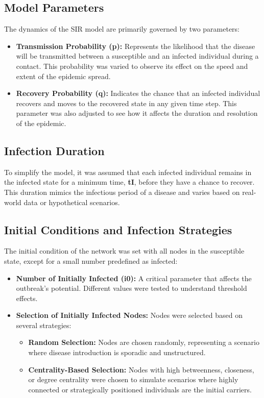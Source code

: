 \documentclass[
	report, %
	11pt, %
]{CSUniSchoolLabReport}
\newcounter{ct}
\begin{document}
\subsection{Model Parameters}
The dynamics of the SIR model are primarily governed by two parameters:
\begin{itemize}
\item \textbf{Transmission Probability (p):} Represents the likelihood that the disease will be transmitted between a susceptible and an infected individual during a contact. This probability was varied to observe its effect on the speed and extent of the epidemic spread.
\item \textbf{Recovery Probability (q):} Indicates the chance that an infected individual recovers and moves to the recovered state in any given time step. This parameter was also adjusted to see how it affects the duration and resolution of the epidemic.
\end{itemize}

\subsection{Infection Duration}
To simplify the model, it was assumed that each infected individual remains in the infected state for a minimum time, \textbf{tI}, before they have a chance to recover. This duration mimics the infectious period of a disease and varies based on real-world data or hypothetical scenarios.

\subsection{Initial Conditions and Infection Strategies}
The initial condition of the network was set with all nodes in the susceptible state, except for a small number predefined as infected:
\begin{itemize}
\item \textbf{Number of Initially Infected (i0):} A critical parameter that affects the outbreak's potential. Different values were tested to understand threshold effects.
\item \textbf{Selection of Initially Infected Nodes:} Nodes were selected based on several strategies:
\begin{itemize}
\item \textbf{Random Selection:} Nodes are chosen randomly, representing a scenario where disease introduction is sporadic and unstructured.
\item \textbf{Centrality-Based Selection:} Nodes with high betweenness, closeness, or degree centrality were chosen to simulate scenarios where highly connected or strategically positioned individuals are the initial carriers.
\end{itemize}
\end{itemize}
\end{document}

